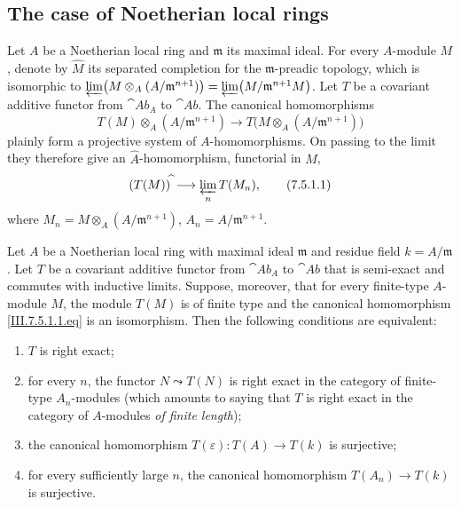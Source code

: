 \subsection{The case of Noetherian local rings}
\label{subsection:III.7.5}

\begin{env}[7.5.1]
\label{III.7.5.1}
Let $A$ be a Noetherian local ring and $\mathfrak m$ its
maximal ideal.  For every $A$-module $M$, denote by
$\widehat M$ its separated completion for the
$\mathfrak m$-preadic topology, which is isomorphic to $\varprojlim\bigl(M\otimes_A(A/\mathfrak m^{n+1})\bigr)=\varprojlim\bigl(M/\mathfrak m^{n+1}M\bigr)$.
Let $T$ be a covariant additive functor from $\cat{Ab}_A$ to
$\cat{Ab}$.  The canonical homomorphisms
\[
  T(M)\otimes_A(A/\mathfrak m^{n+1})
  \longrightarrow
  T\bigl(M\otimes_A(A/\mathfrak m^{n+1})\bigr)
\]
plainly form a projective system of $A$-homomorphisms.  On
passing to the limit they therefore give an
$\widehat A$-homomorphism, functorial in $M$,
\[
  (T(M))^{\widehat{\,}}
  \longrightarrow
  \varprojlim_n T(M_n),
  \tag{7.5.1.1}\label{III.7.5.1.1.eq}
\]
where $M_n=M\otimes_A(A/\mathfrak m^{n+1})$, $A_n=A/\mathfrak m^{n+1}$.
\end{env}

\begin{proposition}[7.5.2]
\label{III.7.5.2}
Let $A$ be a Noetherian local ring with maximal ideal
$\mathfrak m$ and residue field $k=A/\mathfrak m$.  Let $T$
be a covariant additive functor from $\cat{Ab}_A$ to
$\cat{Ab}$ that is semi-exact and commutes with inductive
limits.  Suppose, moreover, that for every finite-type
$A$-module $M$, the module $T(M)$ is of finite type and the
canonical homomorphism \eqref{III.7.5.1.1.eq} is an
isomorphism.  Then the following conditions are equivalent:
\begin{enumerate}
  \item[(a)] $T$ is right exact;
  \item[(b)] for every $n$, the functor $N\leadsto T(N)$ is
    right exact in the category of finite-type $A_n$-modules
    \textup{(which amounts to saying that $T$ is right exact in the
    category of $A$-modules \emph{of finite length})};
  \item[(c)] the canonical homomorphism $T(\varepsilon):T(A)\longrightarrow T(k)$
    is surjective;
  \item[(d)] for every sufficiently large $n$, the canonical
    homomorphism $T(A_n)\longrightarrow T(k)$
    is surjective.
\end{enumerate}
\end{proposition}

